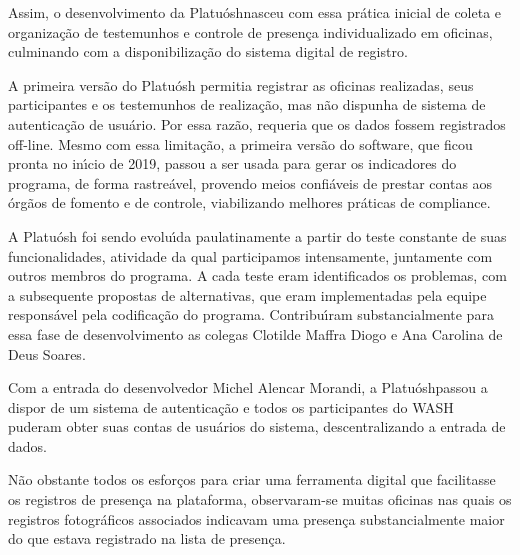 \documentclass[
12pt,		%
openright,	%
twoside,  %
a4paper,			%
chapter=TITLE,		%
english,			%
french,				%
spanish,			%
brazil				%
]{USPSC-classe/USPSC}
\begin{document}
Assim, o desenvolvimento da \textquotedbl Platu\'osh\textquotedbl  nasceu com essa pr\'atica inicial de coleta e organiza\c{c}\~ao de testemunhos e controle de presen\c{c}a individualizado em oficinas, culminando com a disponibiliza\c{c}\~ao do sistema digital de registro.










A primeira vers\~ao do Platu\'osh permitia registrar as oficinas realizadas, seus participantes e os testemunhos de realiza\c{c}\~ao, mas n\~ao dispunha de sistema de autentica\c{c}\~ao de usu\'ario. Por essa raz\~ao, requeria que os dados fossem registrados off-line. Mesmo com essa limita\c{c}\~ao, a primeira vers\~ao do software, que ficou pronta no in\'{\i}cio de 2019, passou a ser usada para gerar os indicadores do programa, de forma rastre\'avel, provendo meios confi\'aveis de prestar contas aos \'org\~aos de fomento e de controle, viabilizando melhores pr\'aticas de \textquotedbl compliance\textquotedbl .










A Platu\'osh foi sendo evolu\'{\i}da paulatinamente a partir do teste constante de suas funcionalidades, atividade da qual participamos intensamente, juntamente com outros membros do programa. A cada teste eram identificados os problemas, com a subsequente propostas de alternativas, que eram implementadas pela equipe respons\'avel pela codifica\c{c}\~ao do programa. Contribu\'{\i}ram substancialmente para essa fase de desenvolvimento as colegas Clotilde Maffra Diogo e Ana Carolina de Deus Soares.










Com a entrada do desenvolvedor Michel Alencar Morandi, a \textquotedbl Platu\'osh\textquotedbl  passou a dispor de um sistema de autentica\c{c}\~ao e todos os participantes do WASH puderam obter suas \textquotedbl contas de usu\'arios do sistema\textquotedbl , descentralizando a entrada de dados.










N\~ao obstante todos os esfor\c{c}os para criar uma ferramenta digital que facilitasse os registros de presen\c{c}a na plataforma, observaram-se muitas oficinas nas quais os registros fotogr\'aficos associados indicavam uma presen\c{c}a substancialmente maior do que estava registrado na lista de presen\c{c}a.
\end{document}
